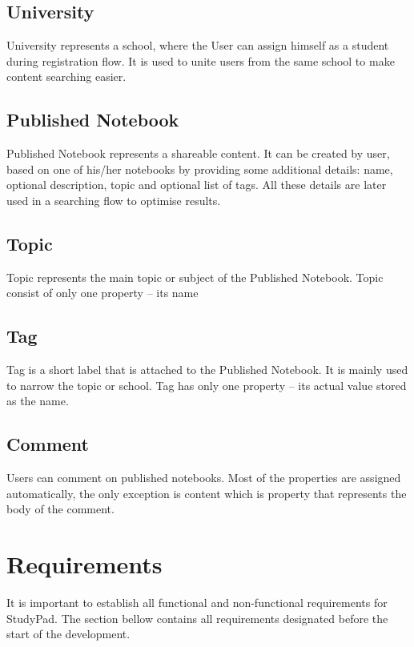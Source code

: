 \documentclass[thesis=B,english]{FITthesis}[2012/10/20]
\newcommand{\appname}{StudyPad}
\begin{document}
	
\subsection{University}
University represents a school, where the User can assign himself as a student during registration flow. It is used to unite users from the same school to make content searching easier. 

\subsection{Published Notebook}
Published Notebook represents a shareable content. It can be created by user, based on one of his/her notebooks by providing some additional details:
name, optional description,  topic and optional list of tags. All these details are later used in a searching flow to optimise results.

\subsection{Topic}
Topic represents the main topic or subject of the Published Notebook. Topic consist of only one property -- its name
\subsection{Tag}
Tag is a short label that is attached to the Published Notebook. It is mainly  used to narrow the topic or school. Tag has only one property -- its actual value stored as the name.

\subsection{Comment}
Users can comment on published notebooks. Most of the properties are assigned automatically, the only exception is content which is property that represents the body of the comment.


\newpage
\section{Requirements}
It is important to establish all functional and non-functional requirements for \appname. The section bellow contains all requirements designated  before the start of the development.
\end{document}
